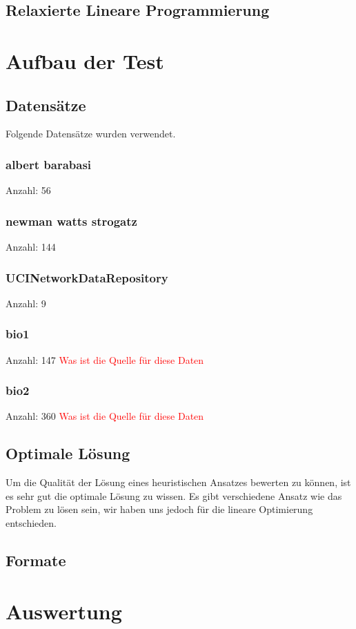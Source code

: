 \documentclass[12pt,a4paper,onecolumn,oneside,titlepage]{article}
\newcommand\todo[1]{\textcolor{red}{#1}}
\begin{document}
\subsection{Relaxierte Lineare Programmierung}


\section{Aufbau der Test}
\subsection{Datensätze}
Folgende Datensätze wurden verwendet.
\subsubsection{albert barabasi}
Anzahl: 56

\subsubsection{newman watts strogatz}
Anzahl: 144
\subsubsection{UCINetworkDataRepository}
Anzahl: 9
\subsubsection{bio1}
Anzahl: 147
\todo{Was ist die Quelle für diese Daten}
\subsubsection{bio2}
Anzahl: 360
\todo{Was ist die Quelle für diese Daten}

\subsection{Optimale Lösung}
Um die Qualität der Lösung eines heuristischen Ansatzes bewerten zu können, ist es sehr gut die optimale Lösung zu wissen. Es gibt verschiedene Ansatz wie das Problem zu lösen sein, wir haben uns jedoch für die lineare Optimierung entschieden.


\subsection{Formate}
\section{Auswertung}
\end{document}
